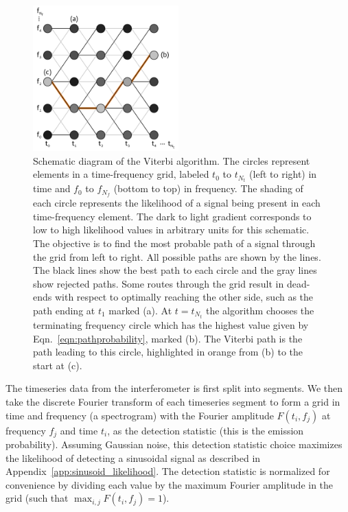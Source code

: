 \documentclass[paper-main.tex]{subfiles}
\begin{document}
\begin{figure}
\includegraphics[width=0.5\textwidth]{figures/viterbiDiagramGrey.pdf}
\caption{\label{fig:viterbi}
Schematic diagram of the Viterbi algorithm. 
The circles represent elements in a time-frequency grid, labeled $t_0$ to $t_{N_t}$ (left to right) in time and $f_0$ to $f_{N_f}$ (bottom to top) in frequency. 
The shading of each circle represents the likelihood of a signal being present in each time-frequency element.
The dark to light gradient corresponds to low to high likelihood values in arbitrary units for this schematic. 
The objective is to find the most probable path of a signal through the grid from left to right.
All possible paths are shown by the lines. 
The black lines show the best path to each circle and the gray lines show rejected paths. 
Some routes through the grid result in dead-ends with respect to optimally reaching the other side, such as the path ending at $t_1$ marked (a).
At $t=t_{N_t}$ the algorithm chooses the terminating frequency circle which has the highest value given by Eqn.~\ref{eqn:pathprobability}, marked (b). 
The Viterbi path is the path leading to this circle, highlighted in orange from (b) to the start at (c). 
}
\end{figure}













The timeseries data from the interferometer is first split into segments. 
We then take the discrete Fourier transform of each timeseries segment to form a grid in time and frequency (a spectrogram) with the Fourier amplitude $F(t_i,f_j)$ at frequency $f_j$ and time $t_i$, as the detection statistic (this is the emission probability).
Assuming Gaussian noise, this detection statistic choice maximizes the likelihood of detecting a sinusoidal signal as described in Appendix~\ref{app:sinusoid_likelihood}.
The detection statistic is normalized for convenience by dividing each value by the maximum Fourier amplitude in the grid (such that $\max_{i,j} F(t_i,f_j) = 1$).
\end{document}
